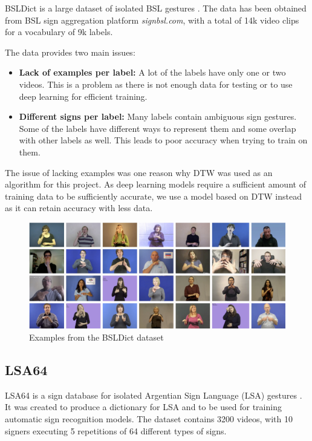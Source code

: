 \documentclass[final,rdr32.tex]{subfiles}
\begin{document}
BSLDict is a large dataset of isolated BSL gestures \cite{momeni2020watch}. The data has been obtained from BSL sign aggregation platform \textit{signbsl.com}, with a total of 14k video clips for a vocabulary of 9k labels.

The data provides two main issues:

\begin{itemize}
    \item \textbf{Lack of examples per label: }A lot of the labels have only one or two videos. This is a problem as there is not enough data for testing or to use deep learning for efficient training.
    \item \textbf{Different signs per label: }Many labels contain ambiguous sign gestures. Some of the labels have different ways to represent them and some overlap with other labels as well. This leads to poor accuracy when trying to train on them.
\end{itemize}

The issue of lacking examples was one reason why DTW was used as an algorithm for this project. As deep learning models require a sufficient amount of training data to be sufficiently accurate, we use a model based on DTW instead as it can retain accuracy with less data.

\begin{figure}[H]
    \begin{center}
        \includegraphics[scale=0.08]{images/BSLDict.jpeg}
        \caption[caption]{Examples from the BSLDict dataset}
    \end{center}
\end{figure}

\subsection*{LSA64}

LSA64 is a sign database for isolated Argentian Sign Language (LSA) gestures \cite{ronchetti2016lsa64}. It was created to produce a dictionary for LSA and to be used for training automatic sign recognition models. The dataset contains 3200 videos, with 10 signers executing 5 repetitions of 64 different types of signs.
\end{document}
